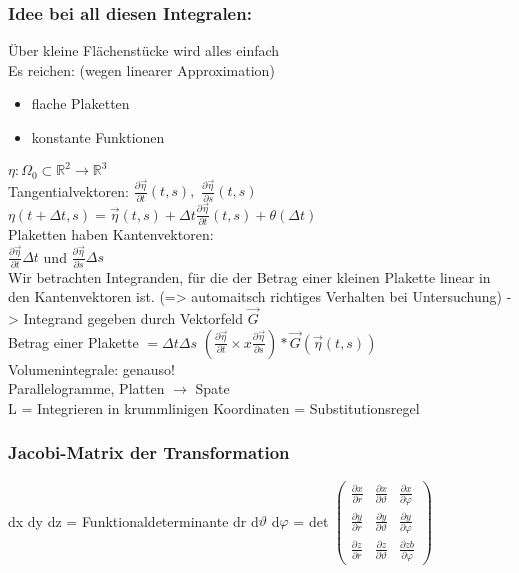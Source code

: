 \documentclass{article}
\begin{document}
\subsubsection{Idee bei all diesen Integralen:}
Über kleine Flächenstücke wird alles einfach\\
Es reichen: (wegen linearer Approximation)\\
\begin{itemize}
\item flache Plaketten
\item konstante Funktionen
\end{itemize}
$\eta: \Omega_0 \subset \mathbb{R}^2 \longrightarrow \mathbb{R}^3$\\
Tangentialvektoren: $\frac{\partial \vec \eta}{\partial t}(t, s), $ $\frac{\partial \vec \eta}{\partial s}(t, s)$\\
$\eta(t+\Delta t, s) = \vec \eta(t, s) + \Delta t \frac{\partial \vec \eta}{\partial t}(t, s) + \theta(\Delta t)$\\
Plaketten haben Kantenvektoren:\\
$\frac{\partial \vec \eta}{\partial t} \Delta t$ und $\frac{\partial \vec \eta}{\partial s} \Delta s$\\
Wir betrachten Integranden, für die der Betrag einer kleinen Plakette linear in den Kantenvektoren ist. (=> automaitsch richtiges Verhalten bei Untersuchung) -> Integrand gegeben durch Vektorfeld $\vec G$\\
Betrag einer Plakette $= \Delta t \Delta s$ $ ( \frac{\partial \vec \eta}{\partial t} \times {x} \frac{\partial \vec \eta}{\partial s} ) * \vec G(\vec \eta(t, s))$\\
Volumenintegrale: genauso!\\
Parallelogramme, Platten $\rightarrow$ Spate\\
L = Integrieren in krummlinigen Koordinaten = Substitutionsregel\\
\subsubsection{Jacobi-Matrix der Transformation}
dx dy dz = Funktionaldeterminante dr d$\vartheta$ d$\varphi$ = det 
$\begin{pmatrix}
\frac{\partial x}{\partial r} & \frac{\partial x}{\partial \vartheta} & \frac{\partial x}{\partial \varphi}  \\
\frac{\partial y}{\partial r} & \frac{\partial y}{\partial \vartheta} & \frac{\partial y}{\partial \varphi} \\
\frac{\partial z}{\partial r} & \frac{\partial z}{\partial \vartheta} & \frac{\partial zb}{\partial \varphi}
\end{pmatrix}$
\end{document}
